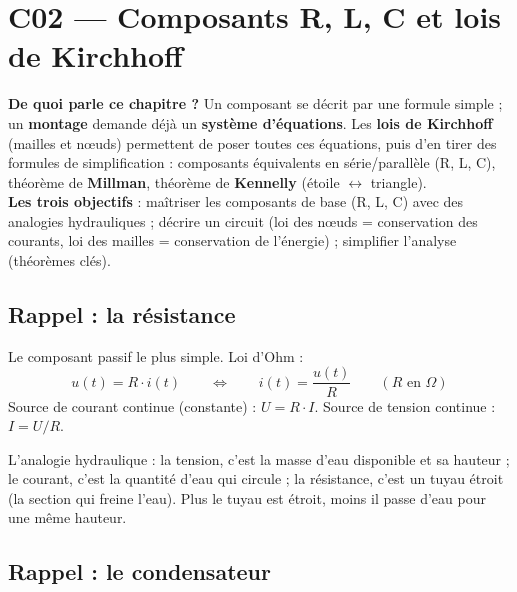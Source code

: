 \chapter{C02 --- Composants R, L, C et lois de Kirchhoff}

\begin{rembox}[title=En bref]
\textbf{De quoi parle ce chapitre ?} Un composant se décrit par une formule simple ; un
\textbf{montage} demande déjà un \textbf{système d'équations}. Les \textbf{lois de Kirchhoff}
(mailles et n\oe uds) permettent de poser toutes ces équations, puis d'en tirer des formules
de simplification : composants équivalents en série/parallèle (R, L, C), théorème de
\textbf{Millman}, théorème de \textbf{Kennelly} (étoile $\leftrightarrow$ triangle). \\
\textbf{Les trois objectifs} : maîtriser les composants de base (R, L, C) avec des analogies
hydrauliques ; décrire un circuit (loi des n\oe uds = conservation des courants, loi des
mailles = conservation de l'énergie) ; simplifier l'analyse (théorèmes clés).
\end{rembox}

\section{Rappel : la résistance}


\begin{defnbox}[title=La résistance]
Le composant passif le plus simple. Loi d'Ohm :
\[ u(t) = R\cdot i(t) \qquad\Longleftrightarrow\qquad i(t) = \frac{u(t)}{R} \qquad (R \text{ en } \Omega) \]
Source de courant continue (constante) : $U = R\cdot I$. Source de tension continue :
$I = U/R$.
\end{defnbox}

\begin{goatbox}
L'analogie hydraulique : la tension, c'est la masse d'eau disponible et sa hauteur ; le
courant, c'est la quantité d'eau qui circule ; la résistance, c'est un tuyau étroit (la
section qui freine l'eau). Plus le tuyau est étroit, moins il passe d'eau pour une même
hauteur.
\end{goatbox}

\section{Rappel : le condensateur}

